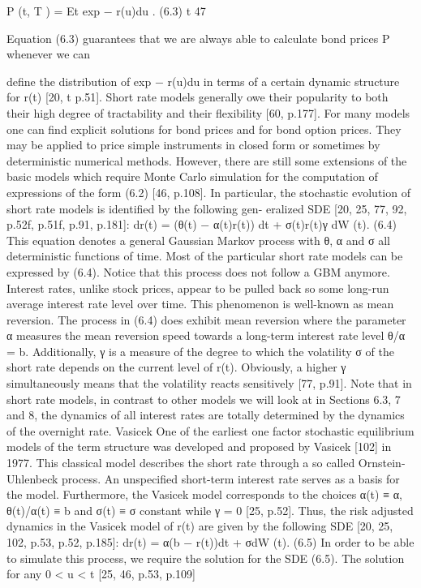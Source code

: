 P (t, T ) = Et exp − r(u)du . (6.3) t
47

Equation (6.3) guarantees that we are always able to calculate bond prices P whenever we can

define the distribution of exp − r(u)du in terms of a certain dynamic structure for r(t) [20,
t
p.51].
Short rate models generally owe their popularity to both their high degree of tractability and
their flexibility [60, p.177]. For many models one can find explicit solutions for bond prices and for bond option prices. They may be applied to price simple instruments in closed form or sometimes by deterministic numerical methods. However, there are still some extensions of the basic models which require Monte Carlo simulation for the computation of expressions of the form (6.2) [46, p.108].
In particular, the stochastic evolution of short rate models is identified by the following gen- eralized SDE [20, 25, 77, 92, p.52f, p.51f, p.91, p.181]:
dr(t) = (θ(t) − α(t)r(t)) dt + σ(t)r(t)γ dW (t). (6.4)
This equation denotes a general Gaussian Markov process with θ, α and σ all deterministic functions of time. Most of the particular short rate models can be expressed by (6.4). Notice that this process does not follow a GBM anymore. Interest rates, unlike stock prices, appear to be pulled back so some long-run average interest rate level over time. This phenomenon is well-known as mean reversion. The process in (6.4) does exhibit mean reversion where the parameter α measures the mean reversion speed towards a long-term interest rate level θ/α = b. Additionally, γ is a measure of the degree to which the volatility σ of the short rate depends on the current level of r(t). Obviously, a higher γ simultaneously means that the volatility reacts sensitively [77, p.91]. Note that in short rate models, in contrast to other models we will look at in Sections 6.3, 7 and 8, the dynamics of all interest rates are totally determined by the dynamics of the overnight rate.
Vasicek
One of the earliest one factor stochastic equilibrium models of the term structure was developed and proposed by Vasicek [102] in 1977. This classical model describes the short rate through a so called Ornstein-Uhlenbeck process. An unspecified short-term interest rate serves as a basis for the model. Furthermore, the Vasicek model corresponds to the choices α(t) ≡ α, θ(t)/α(t) ≡ b and σ(t) ≡ σ constant while γ = 0 [25, p.52]. Thus, the risk adjusted dynamics in the Vasicek model of r(t) are given by the following SDE [20, 25, 102, p.53, p.52, p.185]:
dr(t) = α(b − r(t))dt + σdW (t). (6.5) In order to be able to simulate this process, we require the solution for the SDE (6.5). The
solution for any 0 < u < t [25, 46, p.53, p.109]

